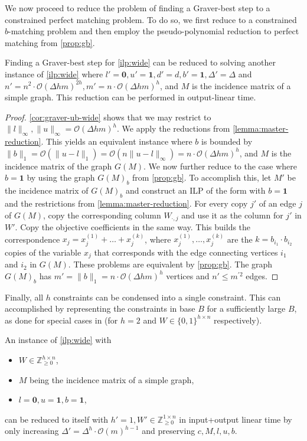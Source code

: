 \documentclass[a4paper,UKenglish,cleveref,thm-restate]{lipics-v2021}
\newcommand{\Z}{\mathbb Z}
\newcommand{\veczero}{\mathbf0}
\newcommand{\vecone}{\mathbf1}
\renewcommand{\O}{\mathcal O}
\begin{document}
We now proceed to reduce the problem of finding a Graver-best step to a constrained perfect matching problem. To do so, we first reduce to a constrained $b$-matching problem and then employ the pseudo-polynomial reduction to perfect matching from \cref{prop:gb}.

\begin{lemma}
    Finding a Graver-best step for \cref{ilp:wide} can be reduced to solving another instance of \cref{ilp:wide} where $l'=\veczero,u'=\vecone,d'=d,b'=\vecone,\Delta'=\Delta$ and $n'=n^2\cdot\O(\Delta hm)^{2h},m'=n\cdot\O(\Delta hm)^h$, and $M$ is the incidence matrix of a simple graph. This reduction can be performed in output-linear time.
    \label{lemma:wide-ip-reduction-to-perfect-matching}
\end{lemma}

\begin{proof}
    \cref{cor:graver-ub-wide} shows that we may restrict to $\|l\|_\infty,\|u\|_\infty=\mathcal O(\Delta hm)^h$. We apply the reductions from \cref{lemma:master-reduction}. This yields an equivalent instance where $b$ is bounded by $\|b\|_1=\O(\|u-l\|_1)=\O(n\|u-l\|_\infty)=n\cdot\O(\Delta hm)^h$, and $M$ is the incidence matrix of the graph $G(M)$. We now further reduce to the case where $b=\vecone$ by using the graph $G(M)_b$ from \cref{prop:gb}. To accomplish this, let $M'$ be the incidence matrix of $G(M)_b$ and construct an ILP of the form  with $b=\vecone$ and the restrictions from \cref{lemma:master-reduction}. For every copy $j'$ of an edge $j$ of $G(M)$, copy the corresponding column $W_{\cdot,j}$ and use it as the column for $j'$ in $W'$. Copy the objective coefficients in the same way. This builds the correspondence $x_j=x_j^{(1)}+\dots+x_j^{(k)}$, where $x_j^{(1)},\dots,x_j^{(k)}$ are the $k=b_{i_1}\cdot b_{i_2}$ copies of the variable $x_j$ that corresponds with the edge connecting vertices $i_1$ and $i_2$ in $G(M)$. These problems are equivalent by \cref{prop:gb}. The graph $G(M)_b$ has $m'=\|b\|_1=n\cdot\O(\Delta hm)^h$ vertices and $n'\le m^{\prime2}$ edges.
\end{proof}

Finally, all $h$ constraints can be condensed into a single constraint. This can accomplished by representing the constraints in base $B$ for a sufficiently large $B$, as done for special cases in \cite{DBLP:journals/mp/BergerBGS11,DBLP:journals/jacm/PapadimitriouY82} (for $h=2$ and $W\in\{0,1\}^{h\times n}$ respectively).

\begin{lemma}
    An instance of \cref{ilp:wide} with
    \begin{itemize}
        \item $W\in\Z_{\ge0}^{h\times n}$,
        \item $M$ being the incidence matrix of a simple graph,
        \item $l=\veczero,u=\vecone,b=\vecone$,
    \end{itemize}
    can be reduced to itself with $h'=1,W'\in\Z_{\ge0}^{1\times n}$ in input+output linear time by only increasing $\Delta'=\Delta^h\cdot\O(m)^{h-1}$ and preserving $c,M,l,u,b$.
    \label{lemma:constraint-condensation}
\end{lemma}
\end{document}

